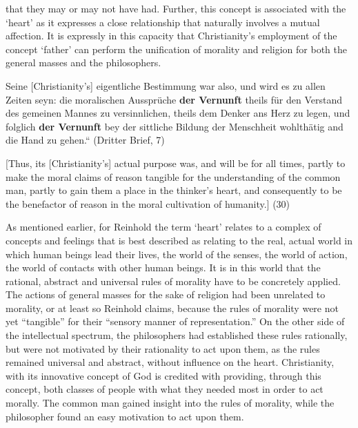 that they may or may not have had. Further, this concept is associated with the `heart' as it expresses a close relationship that naturally involves a mutual affection. It is expressly in this capacity that Christianity's employment of the concept `father' can perform the unification of morality and religion for both the general masses and the philosophers. 

Seine [Christianity's] eigentliche Bestimmung war also, und wird es zu allen Zeiten seyn: \quotedblbase die moralischen Ausspr\"{u}che \textbf{der Vernunft} theils f\"{u}r den Verstand des gemeinen Mannes zu versinnlichen, theils dem Denker ans Herz zu legen, und folglich \textbf{der Vernunft} bey der sittliche Bildung der Menschheit wohlth\"{a}tig and die Hand zu gehen.`` (Dritter Brief, 7)

[Thus, its [Christianity's] actual purpose was, and will be for all times, partly to make the moral claims of reason tangible for the understanding of the common man, partly to gain them a place in the thinker's heart, and consequently to be the benefactor of reason in the moral cultivation of humanity.] (30)

As mentioned earlier, for Reinhold the term `heart' relates to a complex of concepts and feelings that is best described as relating to the real, actual world in which human beings lead their lives, the world of the senses, the world of action, the world of contacts with other human beings. It is in this world that the rational, abstract and universal rules of morality have to be concretely applied. The actions of general masses for the sake of religion had been unrelated to morality, or at least so Reinhold claims, because the rules of morality were not yet ``tangible'' for their ``sensory manner of representation.'' On the other side of the intellectual spectrum, the philosophers had established these rules rationally, but were not motivated by their rationality to act upon them, as the rules remained universal and abstract, without influence on the heart. Christianity, with its innovative concept of God is credited with providing, through this concept, both classes of people with what they needed most in order to act morally. The common man gained insight into the rules of morality, while the philosopher found an easy motivation to act upon them. 

